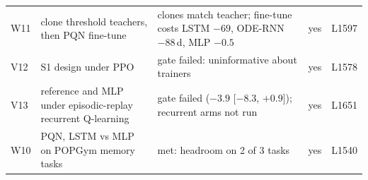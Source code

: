 \documentclass[10pt]{article}
\begin{document}
\begin{table}[h]
{\begin{tabular}{@{}lllll@{}}
W11 & clone threshold teachers, then PQN fine-tune & clones match teacher; fine-tune costs LSTM $-69$, ODE-RNN $-88$\,d, MLP $-0.5$ & yes & L1597 \\
V12 & S1 design under PPO & gate failed: uninformative about trainers & yes & L1578 \\
V13 & reference and MLP under episodic-replay recurrent Q-learning & gate failed ($-3.9$ [$-8.3$, $+0.9$]); recurrent arms not run & yes & L1651 \\
W10 & PQN, LSTM vs MLP on POPGym memory tasks & met: headroom on 2 of 3 tasks & yes & L1540 \\
\bottomrule
\end{tabular}}
\end{table}
\end{document}
